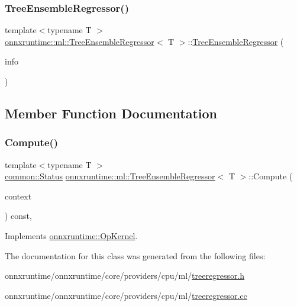 \subsubsection{\texorpdfstring{Tree\+Ensemble\+Regressor()}{TreeEnsembleRegressor()}}
{\footnotesize\ttfamily template$<$typename T $>$ \\
\mbox{\hyperlink{classonnxruntime_1_1ml_1_1TreeEnsembleRegressor}{onnxruntime\+::ml\+::\+Tree\+Ensemble\+Regressor}}$<$ T $>$\+::\mbox{\hyperlink{classonnxruntime_1_1ml_1_1TreeEnsembleRegressor}{Tree\+Ensemble\+Regressor}} (\begin{DoxyParamCaption}\item[{const \mbox{\hyperlink{classonnxruntime_1_1OpKernelInfo}{Op\+Kernel\+Info}} \&}]{info }\end{DoxyParamCaption})\hspace{0.3cm}{\ttfamily [explicit]}}



\subsection{Member Function Documentation}
\mbox{\label{classonnxruntime_1_1ml_1_1TreeEnsembleRegressor_afdc48697c40a7754dde84ba91dd36b3b}} 
\subsubsection{\texorpdfstring{Compute()}{Compute()}}
{\footnotesize\ttfamily template$<$typename T $>$ \\
\mbox{\hyperlink{classonnxruntime_1_1common_1_1Status}{common\+::\+Status}} \mbox{\hyperlink{classonnxruntime_1_1ml_1_1TreeEnsembleRegressor}{onnxruntime\+::ml\+::\+Tree\+Ensemble\+Regressor}}$<$ T $>$\+::Compute (\begin{DoxyParamCaption}\item[{\mbox{\hyperlink{classonnxruntime_1_1OpKernelContext}{Op\+Kernel\+Context}} $\ast$}]{context }\end{DoxyParamCaption}) const\hspace{0.3cm}{\ttfamily [override]}, {\ttfamily [virtual]}}



Implements \mbox{\hyperlink{classonnxruntime_1_1OpKernel_a9eca8656a78b1b3ab9d3351a12798650}{onnxruntime\+::\+Op\+Kernel}}.



The documentation for this class was generated from the following files\+:\begin{DoxyCompactItemize}
\item 
onnxruntime/onnxruntime/core/providers/cpu/ml/\mbox{\hyperlink{treeregressor_8h}{treeregressor.\+h}}\item 
onnxruntime/onnxruntime/core/providers/cpu/ml/\mbox{\hyperlink{treeregressor_8cc}{treeregressor.\+cc}}\end{DoxyCompactItemize}
